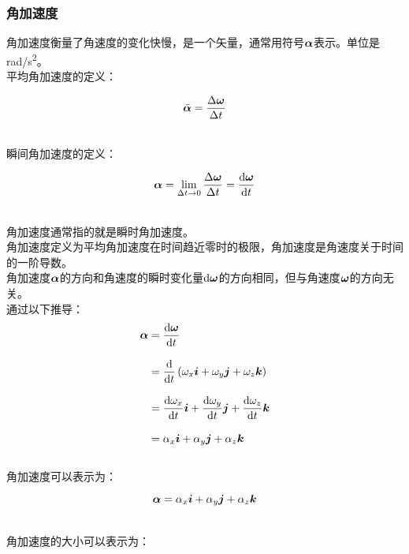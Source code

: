 \documentclass[UTF8]{ctexart}
\newcommand*{\veb}[1]{\vb*{#1}}
\newcommand*{\dif}{\mathop{}\!\mathrm{d}}
\begin{document}
\subsubsection{角加速度}
    角加速度衡量了角速度的变化快慢，是一个矢量，通常用符号$\veb{\alpha}$表示。单位是\si{rad/s^2}。\\[3mm]
    平均角加速度的定义：
    \begin{large}
        \begin{equation*}
            \bar{\veb{\alpha}}=\frac{\Delta \veb{\omega}}{\Delta t}
        \end{equation*}
    \end{large}\\
    瞬间角加速度的定义：
    \begin{large}
        \begin{equation*}
            \veb{\alpha}=\lim_{\Delta t\rightarrow 0}\frac{\Delta \veb{\omega}}{\Delta t}=\frac{\dif\veb{\omega}}{\dif t}
        \end{equation*}
    \end{large}\\
    角加速度通常指的就是瞬时角加速度。\\[3mm]
    角加速度定义为平均角加速度在时间趋近零时的极限，角加速度是角速度关于时间的一阶导数。\\[3mm]
    角加速度$\veb{\alpha}$的方向和角速度的瞬时变化量$\dif\veb{\omega}$的方向相同，但与角速度$\veb{\omega}$的方向无关。\\[6mm]
    通过以下推导：
    \setcounter{equation}{0}
    \begin{align}
        \veb{\alpha}
        &=\frac{\dif\veb{\omega}}{\dif t}\\[3mm]
        &=\frac{\dif}{\dif t}\left(\omega_x\veb{i}+\omega_y\veb{j}+\omega_z\veb{k}\right)\\[3mm]
        &=\frac{\dif \omega_x}{\dif t}\veb{i}+\frac{\dif \omega_y}{\dif t}\veb{j}+\frac{\dif \omega_z}{\dif t}\veb{k}\\[3mm]
        &=\alpha_x\veb{i}+\alpha_y\veb{j}+\alpha_z\veb{k}
    \end{align}\\
    角加速度可以表示为：
    \begin{large}
        \begin{equation*}
            \veb{\alpha}=\alpha_x\veb{i}+\alpha_y\veb{j}+\alpha_z\veb{k}
        \end{equation*}
    \end{large}\\
    角加速度的大小可以表示为：
\end{document}
